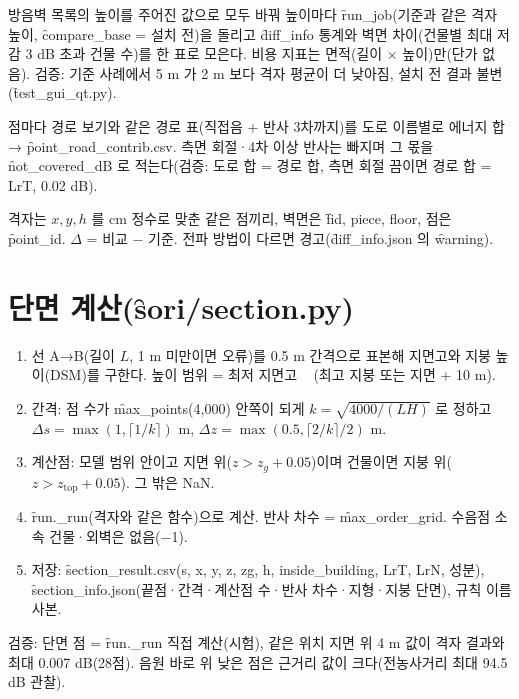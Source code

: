 \documentclass[10.5pt,a4paper]{article}
\begin{document}
 방음벽 목록의 높이를 주어진 값으로 모두 바꿔 높이마다 \f{run\_job}(기준과 같은 격자 높이, \f{compare\_base} = 설치 전)을 돌리고 \f{diff\_info} 통계와 벽면 차이(건물별 최대 저감 3 dB 초과 건물 수)를 한 표로 모은다. 비용 지표는 면적(길이 × 높이)만(단가 없음). 검증: 기준 사례에서 5 m 가 2 m 보다 격자 평균이 더 낮아짐, 설치 전 결과 불변(\f{test\_gui\_qt.py}).

 점마다 경로 보기와 같은 경로 표(직접음 + 반사 3차까지)를 도로 이름별로 에너지 합 → \f{point\_road\_contrib.csv}. 측면 회절·4차 이상 반사는 빠지며 그 몫을 \f{not\_covered\_dB} 로 적는다(검증: 도로 합 = 경로 합, 측면 회절 끔이면 경로 합 = LrT, 0.02 dB).

 격자는 $x, y, h$ 를 cm 정수로 맞춘 같은 점끼리, 벽면은 \f{fid, piece, floor}, 점은 \f{point\_id}. $\Delta$ = 비교 − 기준. 전파 방법이 다르면 경고(\f{diff\_info.json} 의 \f{warning}).

\section{단면 계산(\f{sori/section.py})}
\begin{enumerate}
\item 선 A→B(길이 $L$, 1 m 미만이면 오류)를 0.5 m 간격으로 표본해 지면고와 지붕 높이(DSM)를 구한다. 높이 범위 = 최저 지면고 ~ (최고 지붕 또는 지면 + 10 m).
\item 간격: 점 수가 \f{max\_points}(4,000) 안쪽이 되게 $k = \sqrt{4000/(LH)}$ 로 정하고 $\Delta s = \max(1, \lceil 1/k \rceil)$ m, $\Delta z = \max(0.5, \lceil 2/k\rceil/2)$ m.
\item 계산점: 모델 범위 안이고 지면 위($z > z_g + 0.05$)이며 건물이면 지붕 위($z > z_\mathrm{top} + 0.05$). 그 밖은 NaN.
\item \f{run.\_run}(격자와 같은 함수)으로 계산. 반사 차수 = \f{max\_order\_grid}. 수음점 소속 건물·외벽은 없음(−1).
\item 저장: \f{section\_result.csv}(s, x, y, z, zg, h, inside\_building, LrT, LrN, 성분), \f{section\_info.json}(끝점·간격·계산점 수·반사 차수·지형·지붕 단면), 규칙 이름 사본.
\end{enumerate}
검증: 단면 점 = \f{run.\_run} 직접 계산(시험), 같은 위치 지면 위 4 m 값이 격자 결과와 최대 0.007 dB(28점). 음원 바로 위 낮은 점은 근거리 값이 크다(전농사거리 최대 94.5 dB 관찰).
\end{document}
